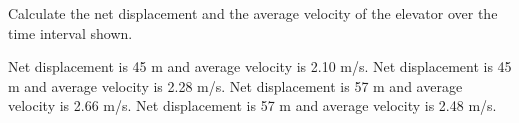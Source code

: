 \documentclass[addpoints]{exam}
\begin{document}
\begin{questions}
\question \label{ques:Unit02_Elevator2}

Calculate the net displacement and the average velocity of the elevator over the time interval shown.

\begin{choices}
\choice Net displacement is 45 m and average velocity is 2.10 m/s.
\choice Net displacement is 45 m and average velocity is 2.28 m/s.
\choice Net displacement is 57 m and average velocity is 2.66 m/s.
\CorrectChoice Net displacement is 57 m and average velocity is 2.48 m/s.
\end{choices}





\end{questions}
\end{document}

